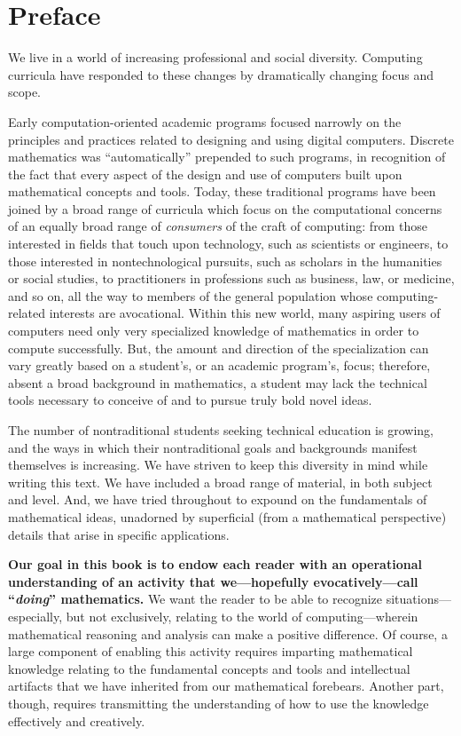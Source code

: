 
\chapter*{Preface}

We live in a world of increasing professional and social diversity.  Computing curricula have responded to these changes by dramatically changing focus and scope.

\smallskip

Early computation-oriented academic programs focused narrowly on the principles and practices related to designing and using digital computers.  Discrete mathematics was ``automatically'' prepended to such programs, in recognition of the fact that every aspect of the design and use of computers built upon mathematical concepts and tools.  Today, these traditional programs have been joined by a broad range of curricula which focus on the computational concerns of an equally broad range of {\em consumers} of the craft of computing: from those interested in fields that touch upon technology, such as scientists or engineers, to those interested in nontechnological pursuits, such as scholars in the humanities or social studies, to practitioners in professions such as business, law, or medicine, and so on, all the way to members of the general population whose computing-related interests are avocational.  Within this new world, many aspiring users of computers need only very specialized knowledge of mathematics in order to compute successfully.  But, the amount and direction of the specialization can vary greatly
based on a student's, or an academic program's, focus; therefore, absent a broad background in mathematics, a student may lack the technical tools necessary to conceive of and to pursue truly bold novel ideas.

\bigskip

The number of nontraditional students seeking technical education is growing, and the ways in which their nontraditional goals and backgrounds manifest themselves is increasing.  We have striven to keep this diversity in mind while writing this text.  We have included a broad range of material, in both subject and level.  And, we have tried throughout to expound on the fundamentals of mathematical ideas, unadorned by superficial (from a mathematical perspective) details that arise in specific applications.

\bigskip

{\bf Our goal in this book is to endow each reader with an operational understanding of an activity that we---hopefully evocatively---call ``{\em doing}'' mathematics.}  We want the reader to be able to recognize situations---especially, but not exclusively, relating to the world of computing---wherein mathematical reasoning and analysis can make a positive difference.  Of course, a large component of enabling this activity requires imparting mathematical knowledge relating to the fundamental concepts and tools and intellectual artifacts that we have inherited from our mathematical forebears.  Another part, though, requires transmitting the understanding of how to use the knowledge effectively and creatively.

